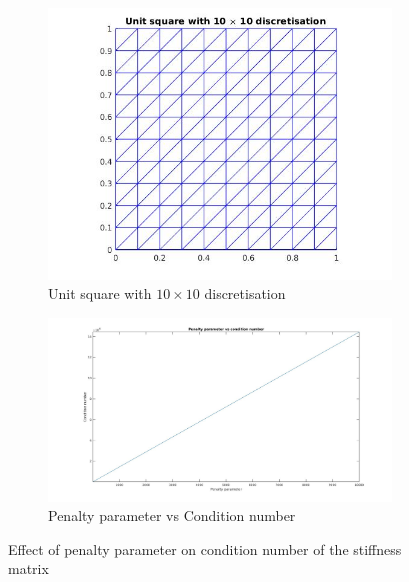 \documentclass[a4paper,openany]{book}
\begin{document}
\begin{figure}
\begin{subfigure}{\textwidth}	
  \includegraphics[width=\linewidth]{grid_penalty_parameter.jpg}
  \caption{Unit square with $10 \times 10$ discretisation}
  \label{grid_penalty_para}
\end{subfigure}
\begin{subfigure}{\textwidth}	
	\includegraphics[width=\linewidth]{penalty_condition_number.jpg}
	\caption{Penalty parameter vs Condition number}
	\label{penalty_condition_number}
\end{subfigure}
\caption{Effect of penalty parameter on condition number of the stiffness matrix}
\label{effect_penalty_parameter}
\end{figure}
\end{document}
